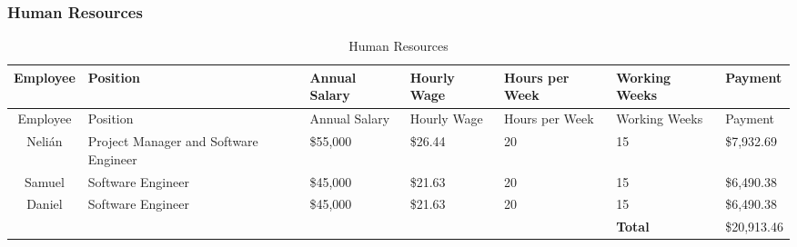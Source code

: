 \subsubsection{Human Resources}
\begin{center}
\setlength{\extrarowheight}{1.5pt}
  \begin{longtable}{|c|p{3.5cm}|p{1.5cm}|p{1cm}|p{1cm}|p{1.5cm}|p{2cm}|}
 \caption{Human Resources} \\
   \hline
  
  \centering Employee & Position & Annual Salary & Hourly Wage & Hours per Week & Working Weeks & Payment \\
  \hline \hline \endfirsthead
  
     \hline

	\centering Employee & Position & Annual Salary & Hourly Wage & Hours per Week & Working Weeks & Payment \\
	\hline \hline \endhead
  
  \endfoot  

    Nelián & Project Manager and Software Engineer & \$55,000  & \$26.44  & 20    & 15    & \$7,932.69  \\ \hline
    Samuel & Software Engineer & \$45,000  & \$21.63  & 20    & 15    & \$6,490.38  \\ \hline
    Daniel & Software Engineer & \$45,000  & \$21.63  & 20    & 15    & \$6,490.38  \\ \hline
    \multicolumn{1}{l}{}      & \multicolumn{1}{l}{}      & \multicolumn{1}{l}{}      & \multicolumn{1}{l}{}      & \multicolumn{1}{l}{}      & \multicolumn{1}{l}{\textbf{Total}} & \multicolumn{1}{l}{\$20,913.46}  \\
          
           \end{longtable}
\end{center}

